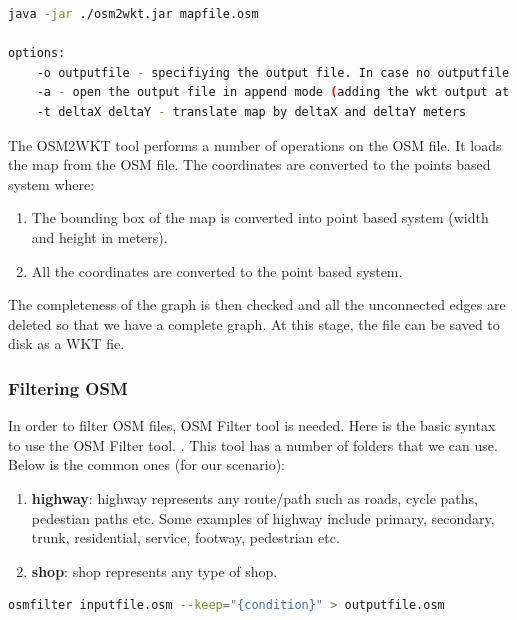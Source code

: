 \begin{lstlisting}[language=bash]
java -jar ./osm2wkt.jar mapfile.osm

options:
	-o outputfile - specifiying the output file. In case no outputfile is mentioned, .wkt is appended to the name of input file.
	-a - open the output file in append mode (adding the wkt output at the end of the output file)
	-t deltaX deltaY - translate map by deltaX and deltaY meters
\end{lstlisting}

\vspace{8mm}
The OSM2WKT tool \cite{mayer2010osm} performs a number of operations on the OSM file. It loads the map from the OSM file. The coordinates are converted to the points based system where:
   	 	\begin{enumerate}
	   	 	\item The bounding box of the map is converted into point based system (width and height in meters).
   		 	\item All the coordinates are converted to the point based system.
   		 \end{enumerate}
   	 The completeness of the graph is then checked and all the unconnected edges are deleted so that we have a complete graph. At this stage, the file can be saved to disk as a WKT fie.

\subsubsection{Filtering OSM}
In order to filter OSM files, OSM Filter tool \cite{osm-filter} is needed. Here is the basic syntax to use the OSM Filter tool.  \cite{osm-filter}. This tool has a number of folders that we can use. Below is the common ones (for our scenario):

\begin{enumerate}
	\item  \textbf{highway}: highway represents any route/path such as roads, cycle paths, pedestian paths etc. Some examples of highway include primary, secondary, trunk, residential, service, footway, pedestrian etc.
	\item \textbf{shop}: shop represents any type of shop.

\end{enumerate}
\vspace{2mm}
\begin{lstlisting}[language=bash]
	osmfilter inputfile.osm --keep="{condition}" > outputfile.osm
\end{lstlisting}
\vspace{5mm}

